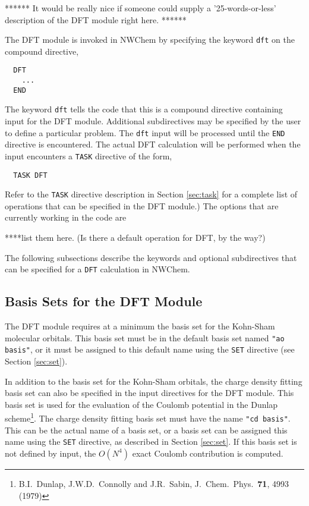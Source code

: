 \label{sec:dft}
\Large
******
It would be really nice if someone could supply a '25-words-or-less'
description of the DFT module right here.
******
\normalsize

The DFT module is invoked in NWChem 
by specifying the keyword \verb+dft+ on the compound directive,

\begin{verbatim}
  DFT
    ...
  END
\end{verbatim}

The keyword \verb+dft+ tells the code that this is a compound directive
containing input for the DFT module.  Additional subdirectives
may be specified by the user to define a particular
problem.  The \verb+dft+ input will be processed until the
\verb+END+ directive is encountered.  The actual DFT calculation will
be performed when the input encounters a \verb+TASK+ directive of the form,

\begin{verbatim}
  TASK DFT
\end{verbatim}

Refer to the \verb+TASK+ directive description in
Section \ref{sec:task} for a complete list of operations that can be
specified in the DFT module.)  The options that are currently working
in the code are

\Large
****list them here.  (Is there a default operation for DFT, by the way?)
\normalsize

The following 
subsections describe the keywords and
optional subdirectives that can be specified for a \verb+DFT+ calculation
in NWChem.


\subsection{Basis Sets for the DFT Module}

The DFT module requires at a minimum the basis set for the Kohn-Sham 
molecular orbitals.  This basis set must be in the default basis set named
{\tt "ao basis"}, or it must be assigned to this default name using the
\verb+SET+ directive (see Section \ref{sec:set}).

In addition to the basis set for the Kohn-Sham orbitals, 
the charge density fitting basis set can also be specified in the 
input directives for the DFT module.  This basis set is used for the 
evaluation of the Coulomb potential in the Dunlap scheme\footnote{B.I.~Dunlap, 
J.W.D.~Connolly and J.R.~Sabin, J.~Chem.~Phys.~{\bf 71},  4993 (1979)}.
The charge density fitting basis set must have the name {\tt "cd basis"}.
This can be the actual name of a basis set, or a basis set can be 
assigned this name using the \verb+SET+ directive, as described in
Section \ref{sec:set}.  If this basis set is not defined by input,
the $O(N^4)$ exact Coulomb contribution is computed.

